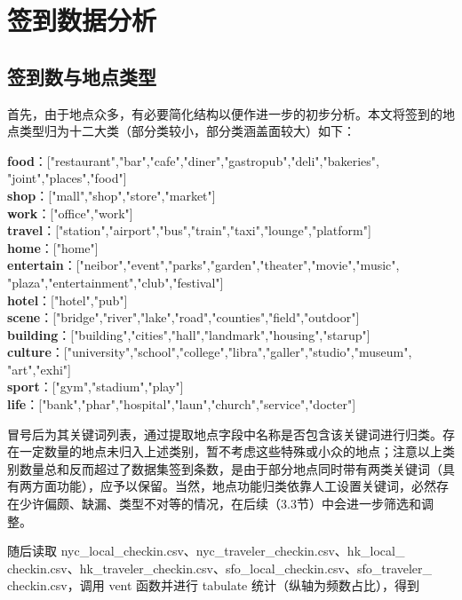 \documentclass[UTF8]{ctexart}
\begin{document}
	\section{签到数据分析}
		\subsection{签到数与地点类型}
		首先，由于地点众多，有必要简化结构以便作进一步的初步分析。本文将签到的地点类型归为十二大类（部分类较小，部分类涵盖面较大）如下：
		
		\noindent\textbf{food}：["restaurant","bar","cafe","diner","gastropub","deli","bakeries",\\"joint","places","food"]\\
		\textbf{shop}：["mall","shop","store","market"]\\
		\textbf{work}：["office","work"]\\
		\textbf{travel}：["station","airport","bus","train","taxi","lounge","platform"]\\
		\textbf{home}：["home"]\\
		\textbf{entertain}：["neibor","event","parks","garden","theater","movie","music",\\"plaza","entertainment","club","festival"]\\
		\textbf{hotel}：["hotel","pub"]\\
		\textbf{scene}：["bridge","river","lake","road","counties","field","outdoor"]\\
		\textbf{building}：["building","cities","hall","landmark","housing","starup"]\\
		\textbf{culture}：["university","school","college","libra","galler","studio","museum",\\"art","exhi"]\\
		\textbf{sport}：["gym","stadium","play"]\\
		\textbf{life}：["bank","phar","hospital","laun","church","service","docter"]
		
		冒号后为其关键词列表，通过提取地点字段中名称是否包含该关键词进行归类。存在一定数量的地点未归入上述类别，暂不考虑这些特殊或小众的地点；注意以上类别数量总和反而超过了数据集签到条数，是由于部分地点同时带有两类关键词（具有两方面功能），应予以保留。当然，地点功能归类依靠人工设置关键词，必然存在少许偏颇、缺漏、类型不对等的情况，在后续（3.3节）中会进一步筛选和调整。
		
		随后读取 nyc\_local\_checkin.csv、nyc\_traveler\_checkin.csv、hk\_local\_\\checkin.csv、hk\_traveler\_checkin.csv、sfo\_local\_checkin.csv、sfo\_traveler\_\\checkin.csv，调用 vent 函数并进行 tabulate 统计（纵轴为频数占比），得到
		
\end{document}
